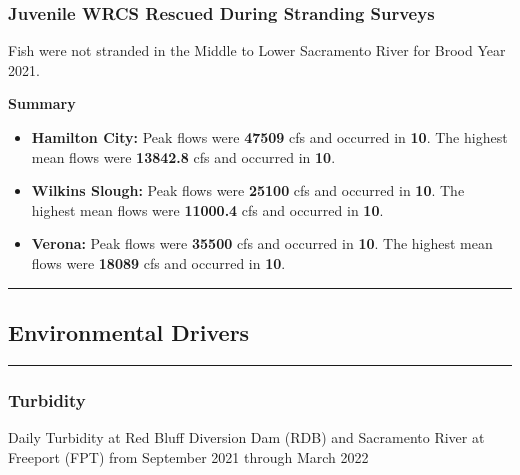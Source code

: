 \documentclass[
]{book}
\theoremstyle{definition}
\theoremstyle{definition}
\theoremstyle{definition}
\theoremstyle{definition}
\theoremstyle{remark}
\begin{document}
\hypertarget{juvenile-wrcs-rescued-during-stranding-surveys}{%
\subsubsection{Juvenile WRCS Rescued During Stranding Surveys}\label{juvenile-wrcs-rescued-during-stranding-surveys}}

Fish were not stranded in the Middle to Lower Sacramento River for Brood Year 2021.

\textbf{Summary}

\begin{itemize}
\item
  \textbf{Hamilton City:} Peak flows were \textbf{47509} cfs and occurred in \textbf{10}. The highest mean flows were \textbf{13842.8} cfs and occurred in \textbf{10}.
\item
  \textbf{Wilkins Slough:} Peak flows were \textbf{25100} cfs and occurred in \textbf{10}. The highest mean flows were \textbf{11000.4} cfs and occurred in \textbf{10}.
\item
  \textbf{Verona:} Peak flows were \textbf{35500} cfs and occurred in \textbf{10}. The highest mean flows were \textbf{18089} cfs and occurred in \textbf{10}.
\end{itemize}

\begin{center}\rule{0.5\linewidth}{0.5pt}\end{center}

\hypertarget{environmental-drivers-2}{%
\subsection{Environmental Drivers}\label{environmental-drivers-2}}

\begin{center}\rule{0.5\linewidth}{0.5pt}\end{center}

\hypertarget{turbidity-1}{%
\subsubsection{Turbidity}\label{turbidity-1}}

\label{fig:RDBFPTDO-fig}Daily Turbidity at Red Bluff Diversion Dam (RDB) and Sacramento River at Freeport (FPT) from September 2021 through March 2022
\end{document}
